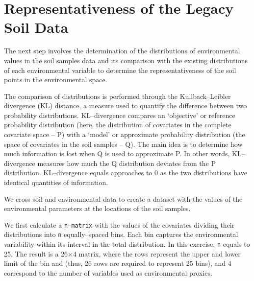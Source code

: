 \documentclass[
  10pt,
  b5paper,
  oneside]{book}
\begin{document}
\hypertarget{representativeness-of-the-legacy-soil-data}{%
\section{Representativeness of the Legacy Soil Data}\label{representativeness-of-the-legacy-soil-data}}

The next step involves the determination of the distributions of environmental values in the soil samples data and its comparison with the existing distributions of each environmental variable to determine the representativeness of the soil points in the environmental space.

The comparison of distributions is performed through the Kullback--Leibler divergence (KL) distance, a measure used to quantify the difference between two probability distributions.
KL--divergence compares an `objective' or reference probability distribution (here, the distribution of covariates in the complete covariate space -- P) with a `model' or approximate probability distribution (the space of covariates in the soil samples -- Q). The main idea is to determine how much information is lost when Q is used to approximate P. In other words, KL--divergence measures how much the Q distribution deviates from the P distribution. KL--divergence equals approaches to 0 as the two distributions have identical quantities of information.

We cross soil and environmental data to create a dataset with the values of the environmental parameters at the locations of the soil samples.

We first calculate a \texttt{\textquotesingle{}n–matrix\textquotesingle{}} with the values of the covariates dividing their distributions into \texttt{\textquotesingle{}n\textquotesingle{}} equally--spaced bins. Each bin captures the environmental variability within its interval in the total distribution. In this exercise, \texttt{\textquotesingle{}n\textquotesingle{}} equals to 25. The result is a 26×4 matrix, where the rows represent the upper and lower limit of the bin and (thus, 26 rows are required to represent 25 bins), and 4 correspond to the number of variables used as environmental proxies.
\end{document}

